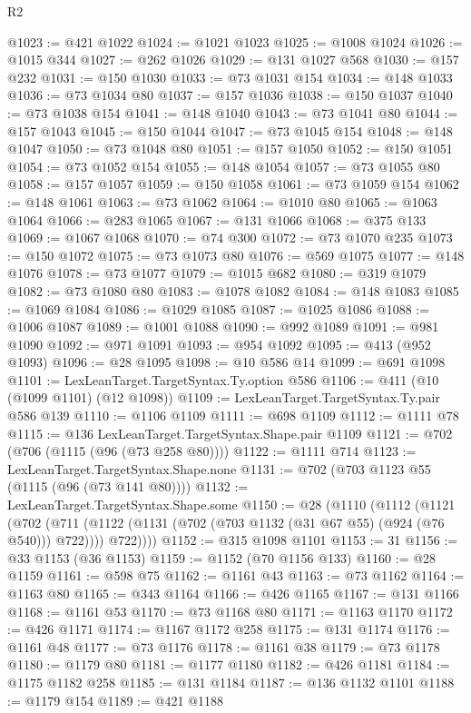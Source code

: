 \begin{lexlean}{R2}
\begin{coremodule}
@1023 := @421 @1022
@1024 := @1021 @1023
@1025 := @1008 @1024
@1026 := @1015 @344
@1027 := @262 @1026
@1029 := @131 @1027 @568
@1030 := @157 @232
@1031 := @150 @1030
@1033 := @73 @1031 @154
@1034 := @148 @1033
@1036 := @73 @1034 @80
@1037 := @157 @1036
@1038 := @150 @1037
@1040 := @73 @1038 @154
@1041 := @148 @1040
@1043 := @73 @1041 @80
@1044 := @157 @1043
@1045 := @150 @1044
@1047 := @73 @1045 @154
@1048 := @148 @1047
@1050 := @73 @1048 @80
@1051 := @157 @1050
@1052 := @150 @1051
@1054 := @73 @1052 @154
@1055 := @148 @1054
@1057 := @73 @1055 @80
@1058 := @157 @1057
@1059 := @150 @1058
@1061 := @73 @1059 @154
@1062 := @148 @1061
@1063 := @73 @1062
@1064 := @1010 @80
@1065 := @1063 @1064
@1066 := @283 @1065
@1067 := @131 @1066
@1068 := @375 @133
@1069 := @1067 @1068
@1070 := @74 @300
@1072 := @73 @1070 @235
@1073 := @150 @1072
@1075 := @73 @1073 @80
@1076 := @569 @1075
@1077 := @148 @1076
@1078 := @73 @1077
@1079 := @1015 @682
@1080 := @319 @1079
@1082 := @73 @1080 @80
@1083 := @1078 @1082
@1084 := @148 @1083
@1085 := @1069 @1084
@1086 := @1029 @1085
@1087 := @1025 @1086
@1088 := @1006 @1087
@1089 := @1001 @1088
@1090 := @992 @1089
@1091 := @981 @1090
@1092 := @971 @1091
@1093 := @954 @1092
@1095 := @413 (@952 @1093)
@1096 := @28 @1095
@1098 := @10 @586 @14
@1099 := @691 @1098
@1101 := LexLeanTarget.TargetSyntax.Ty.option @586
@1106 := @411 (@10 (@1099 @1101) (@12 @1098))
@1109 := LexLeanTarget.TargetSyntax.Ty.pair @586 @139
@1110 := @1106 @1109
@1111 := @698 @1109
@1112 := @1111 @78
@1115 := @136 LexLeanTarget.TargetSyntax.Shape.pair @1109
@1121 := @702 (@706 (@1115 (@96 (@73 @258 @80))))
@1122 := @1111 @714
@1123 := LexLeanTarget.TargetSyntax.Shape.none
@1131 := @702 (@703 @1123 @55 (@1115 (@96 (@73 @141 @80))))
@1132 := LexLeanTarget.TargetSyntax.Shape.some
@1150 := @28
    (@1110
      (@1112
        (@1121
          (@702
            (@711 (@1122 (@1131 (@702 (@703 @1132 (@31 @67 @55) (@924 (@76 @540))) @722))))
            @722))))
@1152 := @315 @1098 @1101
@1153 := 31
@1156 := @33 @1153 (@36 @1153)
@1159 := @1152 (@70 @1156 @133)
@1160 := @28 @1159
@1161 := @598 @75
@1162 := @1161 @43
@1163 := @73 @1162
@1164 := @1163 @80
@1165 := @343 @1164
@1166 := @426 @1165
@1167 := @131 @1166
@1168 := @1161 @53
@1170 := @73 @1168 @80
@1171 := @1163 @1170
@1172 := @426 @1171
@1174 := @1167 @1172 @258
@1175 := @131 @1174
@1176 := @1161 @48
@1177 := @73 @1176
@1178 := @1161 @38
@1179 := @73 @1178
@1180 := @1179 @80
@1181 := @1177 @1180
@1182 := @426 @1181
@1184 := @1175 @1182 @258
@1185 := @131 @1184
@1187 := @136 @1132 @1101
@1188 := @1179 @154
@1189 := @421 @1188

\end{coremodule}
\end{lexlean}
